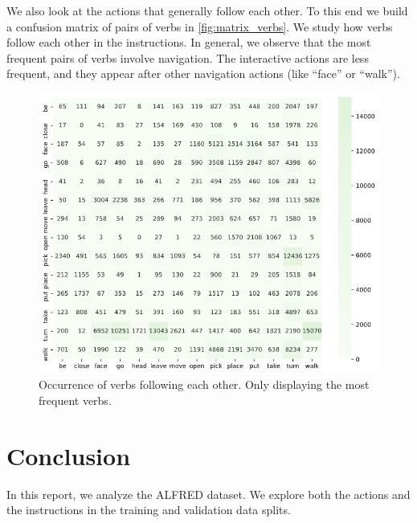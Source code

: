 \documentclass[11pt,a4paper]{article}
\begin{document}
We also look at the actions that generally follow each other. To this end we build a confusion matrix of pairs of verbs in \autoref{fig:matrix_verbs}. We study how verbs follow each other in the instructions. In general, we observe that the most frequent pairs of verbs involve navigation. The interactive actions are less frequent, and they appear after other navigation actions (like ``face'' or ``walk''). 

\begin{figure}
    \centering
    \includegraphics[width=\linewidth]{Reports/1-Task-Definition-and-Data/matrix_verbs.png}
    \caption{Occurrence of verbs following each other. Only displaying the most frequent verbs.}
    \label{fig:matrix_verbs}
\end{figure}


\section{Conclusion}
In this report, we analyze the ALFRED \cite{ALFRED20} dataset. We explore both the actions and the instructions in the training and validation data splits.


\clearpage



\end{document}
